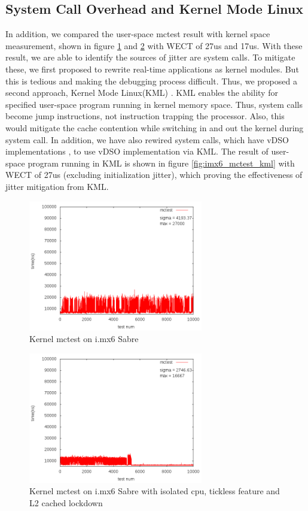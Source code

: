 \documentclass[conference]{IEEEtran}
\begin{document}
\subsection{System Call Overhead and Kernel Mode Linux}

    In addition, we compared the user-space mctest result with kernel space measurement, shown in figure
    \ref{fig:imx6_mctest_k_v} and \ref{fig:imx6_mctest_k_lock} with WECT of 27us and 17us. With these result, we are
    able to identify the sources of jitter are system calls. To mitigate these, we first proposed to rewrite real-time
    applications as kernel modules. But this is tedious and making the debugging process difficult. Thus, we proposed a
    second approach, Kernel Mode Linux(KML) \cite{KML} \cite{KMLConf}. KML enables the ability for specified user-space
    program running in kernel memory space. Thus, system calls become jump instructions, not instruction trapping the
    processor. Also, this would mitigate the cache contention while switching in and out the kernel during system call.
    In addition, we have also rewired system calls, which have vDSO implementations \cite{vDSO}, to use vDSO
    implementation via KML. The result of user-space program running in KML is shown in figure \ref{fig:imx6_mctest_kml}
    with WECT of 27us (excluding initialization jitter), which proving the effectiveness of jitter mitigation from KML.

    \begin{figure} \centering \includegraphics[width=3in]{img/mctest-k-none.png} \caption{Kernel mctest on i.mx6 Sabre}
    \label{fig:imx6_mctest_k_v} \end{figure}
    
    \begin{figure} \centering \includegraphics[width=3in]{img/mctest-k-lock.png} \caption{Kernel mctest on i.mx6 Sabre
    with isolated cpu, tickless feature and L2 cached lockdown} \label{fig:imx6_mctest_k_lock} \end{figure}
    
\end{document}
